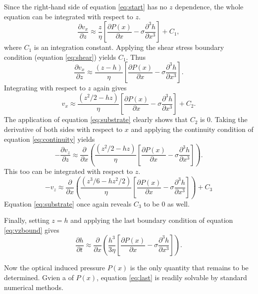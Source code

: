 \documentclass[aps, prl, twocolumn, groupedaddress]{revtex4-1}
\begin{document}
Since the right-hand side of equation \ref{eq:start} has no $z$
dependence, the whole equation can be integrated with respect to $z$.
\begin{equation}
\frac{\partial v_x}{\partial z}  \approx \frac{z}{\eta}\left[\frac{\partial
P(x)}{\partial x}-\sigma\frac{\partial^3 h}{\partial x^3}\right]+C_1 \mathrm{,}
\end{equation}
where $C_1$ is an integration constant. Applying the shear stress
boundary condition (equation \ref{eq:shear}) yields $C_1$. Thus
\begin{equation}
\frac{\partial v_x}{\partial z} \approx \frac{\left(z-h\right)}{\eta}\left[\frac{\partial
P(x)}{\partial x}-\sigma\frac{\partial^3 h}{\partial x^3}\right] \mathrm{.}
\end{equation}
Integrating with respect to $z$ again gives
\begin{equation}
v_x \approx \frac{\left(z^2/2-hz\right)}{\eta}\left[\frac{\partial P(x)}{\partial
x}-\sigma\frac{\partial^3 h}{\partial x^3}\right]+C_2 \mathrm{.}
\end{equation}
The application of equation \ref{eq:substrate} clearly shows that $C_2$ is 0. Taking
the derivative of both sides with respect to $x$ and applying the
continuity condition of equation \ref{eq:continuity} yields
\begin{equation}
-\frac{\partial v_z}{\partial z}  \approx \frac{\partial}{\partial x}
\left(\frac{\left(z^2/2-hz\right)}{\eta}\left[\frac{\partial P(x)}{\partial
x}-\sigma\frac{\partial^3 h}{\partial x^3}\right]\right) \mathrm{.}
\end{equation}
This too can be integrated with respect to $z$.
\begin{equation}
-v_z \approx \frac{\partial}{\partial
x}\left(\frac{\left(z^3/6-hz^2/2\right)}{\eta}\left[\frac{\partial P(x)}{\partial
x}-\sigma\frac{\partial^3 h}{\partial x^3}\right]\right)+C_3 \label{eq:almost}
\end{equation}
Equation \ref{eq:substrate} once again reveals $C_3$ to be $0$ as well.

Finally, setting $z = h$ and applying the last boundary condition of equation
\ref{eq:vzbound} gives
\begin{equation}
\label{eq:last}
\frac{\partial h}{\partial t} \approx \frac{\partial}{\partial
x}\left(\frac{h^3}{3\eta}\left[\frac{\partial P(x)}{\partial x}-\sigma\frac{\partial^3
h}{\partial x^3}\right]\right) \mathrm{.}
\end{equation}

Now the optical induced pressure $P(x)$ is the only quantity that remains
to be determined. Gvien a of $P(x)$, equation \ref{eq:last} is
readily solvable by standard numerical methods.
\end{document}
